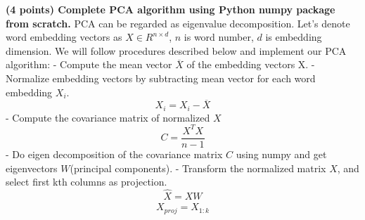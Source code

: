\documentclass[11pt]{article}
\begin{document}
    \textbf{(4 points) Complete PCA algorithm using Python numpy package
from scratch.} PCA can be regarded as eigenvalue decomposition. Let's
denote word embedding vectors as \(X \in R^{n \times d}\), \(n\) is word
number, \(d\) is embedding dimension. We will follow procedures
described below and implement our PCA algorithm: - Compute the mean
vector \(\overline X\) of the embedding vectors X. - Normalize embedding
vectors by subtracting mean vector for each word embedding \(X_i\).
\[X_{i}=X_i-\overline X\] - Compute the covariance matrix of normalized
\(X\) \[C = \frac {X^TX}{n-1}\] - Do eigen decomposition of the
covariance matrix \(C\) using numpy and get eigenvectors \(W\)(principal
components). - Transform the normalized matrix \(X\), and select first
kth columns as projection. \[\hat X = XW\] \[X_{proj} = \hat X_{1:k}\]
\end{document}
